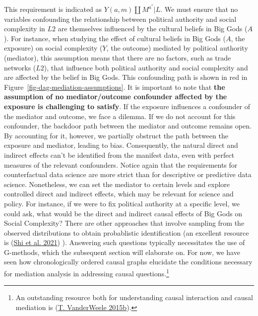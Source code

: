 \documentclass[
  singlecolumn]{report}
\begin{document}
This requirement is indicated as \(Y(a,m) \coprod M^{a^*} | L\). We must
ensure that no variables confounding the relationship between political
authority and social complexity in \(L2\) are themselves influenced by
the cultural beliefs in Big Gods (\(A\)). For instance, when studying
the effect of cultural beliefs in Big Gods (\(A\), the exposure) on
social complexity (\(Y\), the outcome) mediated by political authority
(mediator), this assumption means that there are no factors, such as
trade networks (\(L2\)), that influence both political authority and
social complexity and are affected by the belief in Big Gods. This
confounding path is shown in red in
Figure~\ref{fig-dag-mediation-assumptions}. It is important to note that
\textbf{the assumption of no mediator/outcome confounder affected by the
exposure is challenging to satisfy}. If the exposure influences a
confounder of the mediator and outcome, we face a dilemma. If we do not
account for this confounder, the backdoor path between the mediator and
outcome remains open. By accounting for it, however, we partially
obstruct the path between the exposure and mediator, leading to bias.
Consequently, the natural direct and indirect effects can't be
identified from the manifest data, even with perfect measures of the
relevant confounders. Notice again that the requirements for
counterfactual data science are more strict than for descriptive or
predictive data science. Nonetheless, we can set the mediator to certain
levels and explore controlled direct and indirect effects, which may be
relevant for science and policy. For instance, if we were to fix
political authority at a specific level, we could ask, what would be the
direct and indirect causal effects of Big Gods on Social Complexity?
There are other approaches that involve sampling from the observed
distributions to obtain probablistic identification (an excellent
resource is (\protect\hyperlink{ref-shi2021}{Shi et al. 2021}) ).
Answering such questions typically necessitates the use of G-methods,
which the subsequent section will elaborate on. For now, we have seen
how chronologically ordered causal graphs elucidate the conditions
necessary for mediation analysis in addressing causal
questions.\footnote{An outstanding resource both for understanding
  causal interaction and causal mediation is
  (\protect\hyperlink{ref-vanderweele2015a}{T. VanderWeele 2015b}).}
\end{document}
